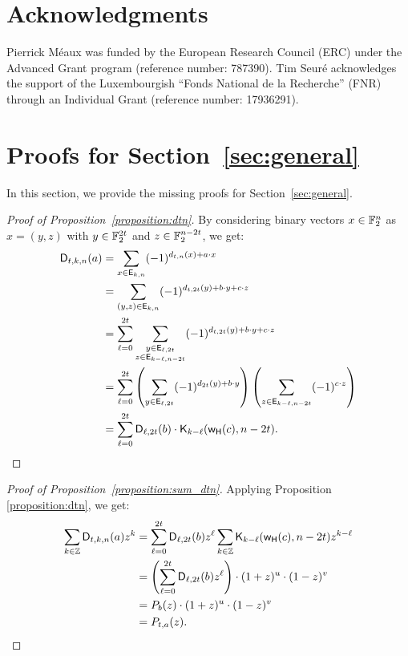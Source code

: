 \documentclass{llncs}
\begin{document}
\ifnum{}
	\section{Acknowledgments}
	Pierrick Méaux was funded by the European Research Council (\textsf{ERC}) under the Advanced Grant program (reference number: 787390). Tim Seuré acknowledges the support of the Luxembourgish “Fonds National de la Recherche” (\textsf{FNR}) through an Individual Grant (reference number: 17936291).
\fi

\newpage

\ifnum{}
	
	
\else
	
	
\fi

\appendix

\section{Proofs for Section~\ref{sec:general}}\label{sec:proofs}

In this section, we provide the missing proofs for Section~\ref{sec:general}.

\begin{proof}[Proof of Proposition~\ref{proposition:dtn}]
    By considering binary vectors $x\in\mathbb{F}_2^n$ as $x=(y,z)$ with $y\in\mathbb{F}_2^{2t}$ and $z\in\mathbb{F}_2^{n-2t}$, we get:	
	\begin{align*}
		\mathsf{D}_{t,k,n}(a)&=\sum_{x \in \mathsf{E}_{k,n}} (-1)^{d_{t,n}(x)+a \cdot x}\\
		&=\sum_{(y,z)\in\mathsf{E}_{k,n}} (-1)^{d_{t,2t}(y)+b \cdot y +c \cdot z}\\
		&=\sum_{\ell=0}^{2t} \sum_{\substack{y \in \mathsf{E}_{\ell,2t}\\z \in \mathsf{E}_{k-\ell,n-2t}}} (-1)^{d_{t,2t}(y)+b \cdot y +c \cdot z}\\
		&=\sum_{\ell=0}^{2t}\left(\sum_{y \in \mathsf{E}_{\ell,2t}} (-1)^{d_{2t}(y)+b \cdot y}\right)\left( \sum_{z \in \mathsf{E}_{k-\ell,n-2t}} (-1)^{c \cdot z}\right)\\&=\sum_{\ell=0}^{2t} \mathsf{D}_{\ell,2t}(b)\cdot\mathsf{K}_{k-\ell}(\mathsf{w_H}(c),n-2t).\qedhere
	\end{align*}
\end{proof}

\begin{proof}[Proof of Proposition~\ref{proposition:sum_dtn}]
    Applying Proposition \ref{proposition:dtn}, we get:
    \begin{align*}
        \sum_{k\in\mathbb{Z}}\mathsf{D}_{t,k,n}(a)z^k&=\sum_{\ell=0}^{2t}\mathsf{D}_{\ell,2t}(b)z^\ell\sum_{k\in\mathbb{Z}}\mathsf{K}_{k-\ell}(\mathsf{w_H}(c),n-2t)z^{k-\ell}\\
        &=\left(\sum_{\ell=0}^{2t}\mathsf{D}_{\ell,2t}(b)z^\ell\right)\cdot(1+z)^u\cdot(1-z)^v\\
        &=P_b(z)\cdot(1+z)^u\cdot(1-z)^v\\
        &=P_{t,a}(z).\qedhere
    \end{align*}
\end{proof}
\end{document}
